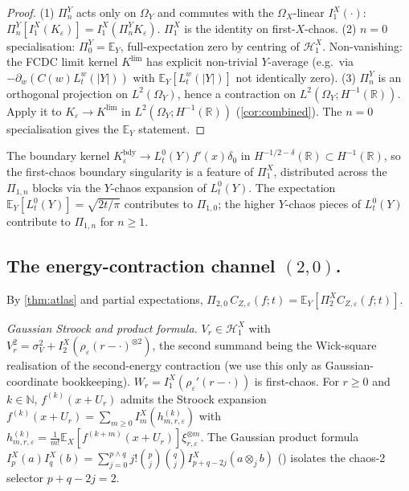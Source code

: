 \documentclass[EJP]{ejpecp}
\newcommand{\R}{\mathbb{R}}
\newcommand{\N}{\mathbb{N}}
\renewcommand{\E}{\mathbb{E}}
\newcommand{\Hilb}{\mathcal{H}}
\newcommand{\IBM}{Z}
\newcommand{\Pir}{\Pi}
\begin{document}
\begin{proof}
(1) $\Pir_n^Y$ acts only on $\Omega_Y$ and commutes with the
$\Omega_X$-linear $I_1^X(\cdot)$:
$\Pir_n^Y[I_1^X(K_\varepsilon)]=I_1^X(\Pir_n^Y K_\varepsilon)$.
$\Pir_1^X$ is the identity on first-$X$-chaos.
(2) $n=0$ specialisation: $\Pir_0^Y=\E_Y$, full-expectation zero by
centring of $\Hilb_1^X$. Non-vanishing: the FCDC limit kernel
$K^{\mathrm{lim}}$ has explicit non-trivial $Y$-average (e.g.\ via
$-\partial_w(C(w)L_t^{w}(|Y|))$ with $\E_Y[L_t^{w}(|Y|)]$ not
identically zero).
(3) $\Pir_n^Y$ is an orthogonal projection on $L^{2}(\Omega_Y)$,
hence a contraction on $L^{2}(\Omega_Y;H^{-1}(\R))$. Apply it to
$K_\varepsilon\to K^{\mathrm{lim}}$ in $L^{2}(\Omega_Y;H^{-1}(\R))$
(\cref{cor:combined}). The $n=0$ specialisation gives the $\E_Y$
statement.
\end{proof}

\begin{remark}[Boundary local time inside $\Pir_1^X$]
\label{rem:bdy-local-time}
The boundary kernel $K_\varepsilon^{\mathrm{bdy}}\to L_t^{0}(Y)f'(x)\delta_0$
in $H^{-1/2-\delta}(\R)\subset H^{-1}(\R)$, so the first-chaos
boundary singularity is a feature of $\Pir_1^X$, distributed across
the $\Pir_{1,n}$ blocks via the $Y$-chaos expansion of $L_t^{0}(Y)$.
The expectation $\E_Y[L_t^{0}(Y)]=\sqrt{2t/\pi}$ contributes to
$\Pir_{1,0}$; the higher $Y$-chaos pieces of $L_t^{0}(Y)$
contribute to $\Pir_{1,n}$ for $n\ge 1$.
\end{remark}

\subsection*{The energy-contraction channel $(2,0)$.}

By \cref{thm:atlas} and partial expectations,
$\Pir_{2,0}\,C_{\IBM,\varepsilon}(f;t)=\E_Y[\Pir_2^X C_{\IBM,\varepsilon}(f;t)]$.

\emph{Gaussian Stroock and product formula.}
$V_r\in\Hilb_1^X$ with $V_r^{2}=\sigma_V^{2}+I_2^X(\rho_\varepsilon(r-\cdot)^{\otimes 2})$,
the second summand being the Wick-square realisation of the
second-energy contraction (we use this only as Gaussian-coordinate
bookkeeping). $W_r=I_1^X(\rho_\varepsilon'(r-\cdot))$ is first-chaos.
For $r\ge 0$ and $k\in\N$, $f^{(k)}(x+U_r)$ admits the Stroock
expansion $f^{(k)}(x+U_r)=\sum_{m\ge 0}I_m^X(h^{(k)}_{m,r,\varepsilon})$
with $h^{(k)}_{m,r,\varepsilon}=\frac{1}{m!}\E_X[f^{(k+m)}(x+U_r)]\xi_{r,\varepsilon}^{\otimes m}$.
The Gaussian product formula
$I_p^X(a)I_q^X(b)=\sum_{j=0}^{p\wedge q}j!\binom{p}{j}\binom{q}{j}I_{p+q-2j}^X(a\otimes_j b)$
(\cite[\S1.1.3]{Nualart}) isolates the chaos-2 selector $p+q-2j=2$.
\end{document}
